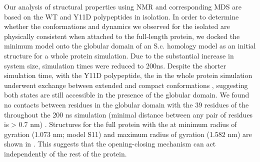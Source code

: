 Our analysis of \gct structural properties using NMR and corresponding MDS are based on the WT and Y11D \gct polypeptides in isolation. In order to determine whether the conformations and dynamics we observed for the isolated \gct are physically consistent when attached to the full-length \tub protein, we docked the minimum \diffusion \gct model  onto the globular domain of an S.c. \tub homology model as an initial structure for a whole protein simulation. Due to the substantial increase in system size, simulation times were reduced to 200ns.  Despite the shorter simulation time, with the Y11D \gct polypeptide, the \gct in the whole protein simulation underwent exchange between extended and compact conformations , suggesting both states are still accessible in the presence of the globular domain. We found no contacts between residues in the globular domain with the 39 residues of the \gct throughout the 200 ns simulation (minimal distance between any pair of residues is > 0.7 nm) . Structures for the full protein with the \gct at minimum radius of gyration (1.073 nm; model S11) and maximum radius of gyration (1.582 nm) are shown in . This suggests that the \gct opening-closing mechanism can act independently of the rest of the protein.



\begin{figure}
	\thispagestyle{empty}
	\centering     %
	\clearpage
	\label{fig:globular}
\end{figure}


